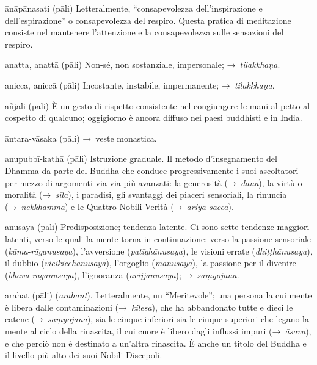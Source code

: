 \begin{glossarydescription}
\item[ānāpānasati] (pāli) Letteralmente, ``consapevolezza dell'inspirazione e
  dell'espirazione'' o consapevolezza del respiro. Questa pratica di meditazione
  consiste nel mantenere l'attenzione e la consapevolezza sulle sensazioni del
  respiro.

\item[anatta, anattā] (pāli) Non-sé, non sostanziale, impersonale;
  →~\emph{tilakkhaṇa}.

\item[anicca, aniccā] (pāli) Incostante, instabile, impermanente;
  →~\emph{tilakkhaṇa}.

\item[añjali] (pāli) È un gesto di rispetto consistente nel congiungere le mani
  al petto al cospetto di qualcuno; oggigiorno è ancora diffuso nei paesi
  buddhisti e in India.

\item[āntara-vāsaka] (pāli) →~veste monastica.

\item[anupubbī-kathā] (pāli) Istruzione graduale. Il metodo d'insegnamento del
  Dhamma da parte del Buddha che conduce progressivamente i suoi ascoltatori per
  mezzo di argomenti via via più avanzati: la generosità (→~\emph{dāna}), la
  virtù o moralità (→~\emph{sīla}), i paradisi, gli svantaggi dei piaceri
  sensoriali, la rinuncia (→~\emph{nekkhamma}) e le Quattro Nobili Verità
  (→~\emph{ariya-sacca}).

\item[anusaya] (pāli) Predisposizione; tendenza latente. Ci sono sette tendenze
  maggiori latenti, verso le quali la mente torna in continuazione: verso la
  passione sensoriale (\emph{kāma}-\emph{rāganusaya}), l'avversione
  (\emph{patīghānusaya}), le visioni errate (\emph{dhiṭṭhānusaya}), il dubbio
  (\emph{vicikicchānusaya}), l'orgoglio (\emph{mānusaya}), la passione per il
  divenire (\emph{bhava}-\emph{rāganusaya}), l'ignoranza (\emph{avijjānusaya});
  →~\emph{saṃyojana.}

\item[arahat] (pāli) (\emph{arahant}). Letteralmente, un ``Meritevole''; una
  persona la cui mente è libera dalle contaminazioni (→~\emph{kilesa}), che ha
  abbandonato tutte e dieci le catene (→~\emph{saṃyojana}), sia le cinque
  inferiori sia le cinque superiori che legano la mente al ciclo della
  rinascita, il cui cuore è libero dagli influssi impuri (→~\emph{āsava}), e che
  perciò non è destinato a un'altra rinascita. È anche un titolo del Buddha e il
  livello più alto dei suoi Nobili Discepoli.


\end{glossarydescription}
